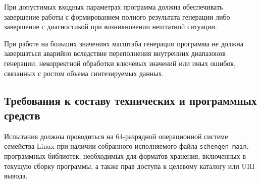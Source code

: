 При допустимых входных параметрах программа должна обеспечивать завершение
работы с формированием полного результата генерации либо завершение с
диагностикой при возникновении нештатной ситуации.

При работе на больших значениях масштаба генерации программа не должна
завершаться аварийно вследствие переполнения внутренних диапазонов генерации,
некорректной обработки ключевых значений или иных ошибок, связанных с ростом
объема синтезируемых данных.

\subsection{Требования к составу технических и программных средств}

Испытания должны проводиться на 64-разрядной операционной системе семейства
Linux при наличии собранного исполняемого файла \texttt{schengen\_main},
программных библиотек, необходимых для форматов хранения, включенных в текущую
сборку программы, а также прав доступа к целевому каталогу или URI вывода.
